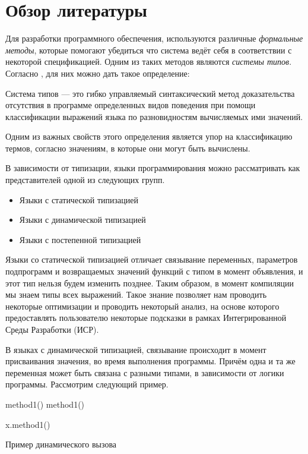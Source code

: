 \section{Обзор литературы}

Для разработки программного обеспечения, используются различные \textit{формальные методы}, которые помогают убедиться что система ведёт себя в соответствии с некоторой спецификацией. Одним из таких методов являются \textit{системы типов}. Согласно \cite{book:pierce2002types}, для них можно дать такое определение:


\begin{definition}
Система типов --- это гибко управляемый синтаксический метод доказательства отсутствия в программе определенных видов поведения при помощи классификации выражений языка по разновидностям вычисляемых ими значений.
\end{definition}

Одним из важных свойств этого определения является упор на классификацию термов, согласно значениям, в которые они могут быть вычислены.

В зависимости от типизации, языки программирования можно рассматривать как представителей одной из следующих групп.
\begin{itemize}
\itemsep-1mm
\item Языки с статической типизацией
\item Языки с динамической типизацией
\item Языки с постепенной типизацией
\end{itemize}



Языки со статической типизацией отличает связывание переменных, параметров подпрограмм и возвращаемых значений функций с типом в момент объявления, и этот тип нельзя будем изменить позднее. Таким образом, в момент компиляции мы знаем типы всех выражений. Такое знание позволяет нам проводить некоторые оптимизации и проводить некоторый анализ, на основе которого предоставлять пользователю некоторые подсказки в рамках Интегрированной Среды Разработки (ИСР).

В языках с динамической типизацией, связывание происходит в момент присваивания  значения, во время выполнения программы. Причём одна и та же переменная может быть связана с разными типами, в зависимости от логики программы. Рассмотрим следующий пример.

\vskip4pt
\begin{algorithm}[H]
\SetAlgoLined
\DontPrintSemicolon
{} {
method1()
}
 {
method1()
}

x.method1()
\caption{Пример динамического вызова}
\end{algorithm}
\vskip4pt

